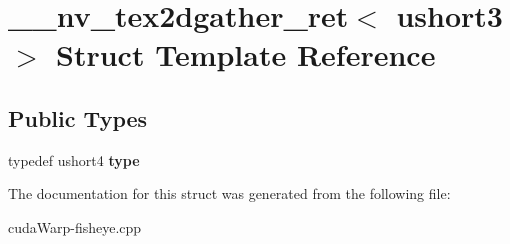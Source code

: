 \hypertarget{struct____nv__tex2dgather__ret_3_01ushort3_01_4}{}\section{\+\_\+\+\_\+nv\+\_\+tex2dgather\+\_\+ret$<$ ushort3 $>$ Struct Template Reference}
\label{struct____nv__tex2dgather__ret_3_01ushort3_01_4}
\subsection*{Public Types}
\begin{DoxyCompactItemize}
\item 
typedef ushort4 {\bfseries type}\hypertarget{struct____nv__tex2dgather__ret_3_01ushort3_01_4_a5f6961c315e4a13e7b2520f5a6bb26ed}{}\label{struct____nv__tex2dgather__ret_3_01ushort3_01_4_a5f6961c315e4a13e7b2520f5a6bb26ed}

\end{DoxyCompactItemize}


The documentation for this struct was generated from the following file\+:\begin{DoxyCompactItemize}
\item 
cuda\+Warp-\/fisheye.\+cpp\end{DoxyCompactItemize}
